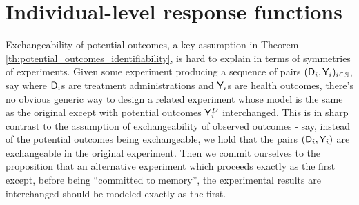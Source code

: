 


\section{Individual-level response functions}\label{sec:ilevel_ccontract}

Exchangeability of potential outcomes, a key assumption in Theorem \ref{th:potential_outcomes_identifiability}, is hard to explain in terms of symmetries of experiments. Given some experiment producing a sequence of pairs $(\mathsf{D}_i,\mathsf{Y}_i)_{i\in\mathbb{N}}$, say where $\mathsf{D}_i$s are treatment administrations and $\mathsf{Y}_i$s are health outcomes, there's no obvious generic way to design a related experiment whose model is the same as the original except with potential outcomes $\mathsf{Y}^D_i$ interchanged. This is in sharp contrast to the assumption of exchangeability of observed outcomes - say, instead of the potential outcomes being exchangeable, we hold that the pairs $(\mathsf{D}_i,\mathsf{Y}_i)$ are exchangeable in the original experiment. Then we commit ourselves to the proposition that an alternative experiment which proceeds exactly as the first except, before being ``committed to memory'', the experimental results are interchanged should be modeled exactly as the first.


